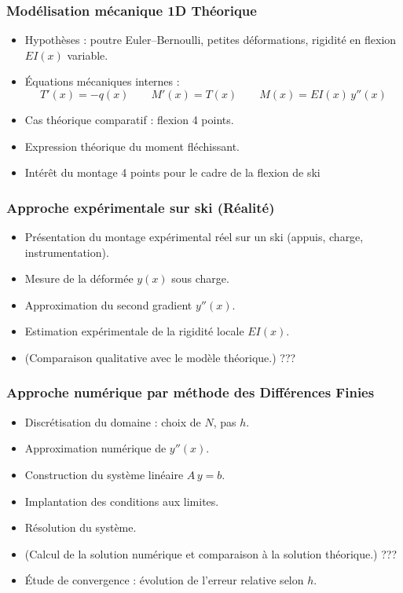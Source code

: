 \documentclass[12pt, a4paper]{article}
\begin{document}
\subsubsection{Modélisation mécanique 1D Théorique}
\begin{itemize}
    \item Hypothèses : poutre Euler--Bernoulli, petites déformations, rigidité en flexion $EI(x)$ variable.
    \item Équations mécaniques internes :
    \[
        T'(x) = -q(x) \qquad M'(x) = T(x) \qquad M(x) = EI(x)\,y''(x)
    \]
    \item Cas théorique comparatif : flexion 4 points.
    \item Expression théorique du moment fléchissant.
    \item Intérêt du montage 4 points pour le cadre de la flexion de ski
\end{itemize}

\subsubsection{Approche expérimentale sur ski (Réalité)}
\begin{itemize}
    \item Présentation du montage expérimental réel sur un ski (appuis, charge, instrumentation).
    \item Mesure de la déformée $y(x)$ sous charge.
    \item Approximation du second gradient $y''(x)$.
    \item Estimation expérimentale de la rigidité locale $EI(x)$.
    \item (Comparaison qualitative avec le modèle théorique.) ???
\end{itemize}

\subsubsection{Approche numérique par méthode des Différences Finies}
\begin{itemize}
    \item Discrétisation du domaine : choix de $N$, pas $h$.
    \item Approximation numérique de $y''(x)$.
    \item Construction du système linéaire $A\,y = b$.
    \item Implantation des conditions aux limites.
    \item Résolution du système.
    \item (Calcul de la solution numérique et comparaison à la solution théorique.) ???
    \item Étude de convergence : évolution de l'erreur relative selon $h$.
\end{itemize}
\end{document}

